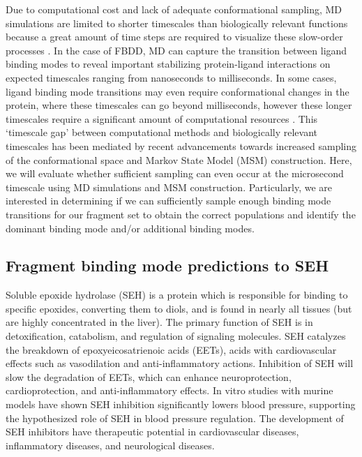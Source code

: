\documentclass[journal=jcisd8,manuscript=article]{achemso}
\begin{document}
Due to computational cost and lack of adequate conformational sampling, MD simulations are limited to shorter timescales than biologically relevant functions because a great amount of time steps are required to visualize these slow-order processes \cite{salmaso_bridging_2018}. 
In the case of FBDD, MD can capture the transition between ligand binding modes to reveal important stabilizing protein-ligand interactions on expected timescales ranging from nanoseconds to milliseconds.
In some cases, ligand binding mode transitions may even require conformational changes in the protein, where these timescales can go beyond milliseconds, however these longer timescales require a significant amount of computational resources  \cite{schlick_biomolecular_1997,macek_backbone_2007}.
This `timescale gap' between computational methods and biologically relevant timescales has been mediated by recent advancements towards increased sampling of the conformational space and Markov State Model (MSM) construction.
Here, we will evaluate whether sufficient sampling can even occur at the microsecond timescale using MD simulations and MSM construction.
Particularly, we are interested in determining if we can sufficiently sample enough binding mode transitions for our fragment set to obtain the correct populations and identify the dominant binding mode and/or additional binding modes.

\subsection{Fragment binding mode predictions to SEH} 
Soluble epoxide hydrolase (SEH) is a protein which is responsible for binding to specific epoxides, converting them to diols, and is found in nearly all tissues (but are highly concentrated in the liver).
The primary function of SEH is in detoxification, catabolism, and regulation of signaling molecules.
SEH catalyzes the breakdown of epoxyeicosatrienoic acids (EETs), acids with cardiovascular effects such as vasodilation and anti-inflammatory actions. 
Inhibition of SEH will slow the degradation of EETs, which can enhance neuroprotection, cardioprotection, and anti-inflammatory effects. 
In vitro studies with murine models have shown SEH inhibition significantly lowers blood pressure, supporting the hypothesized role of SEH in blood pressure regulation. 
The development of SEH inhibitors have therapeutic potential in cardiovascular diseases, inflammatory diseases, and neurological diseases. \cite{morisseau_impact_2013,morisseau_epoxide_2005,kodani_2014_2015}
\end{document}
